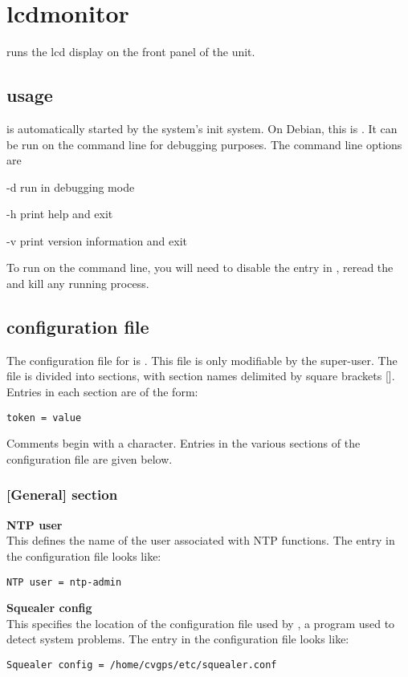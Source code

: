 \section{lcdmonitor}

 runs the lcd display on the front panel of the  unit.

\subsection{usage}
 is automatically started by the system's init system. On Debian, this is . It can be run on
the command line for debugging purposes. The command line options are
\begin{description*}
	\item[-d]	run in debugging mode
	\item[-h]	print help and exit
	\item[-v]	print version information and exit
\end{description*}
To run  on the command line, you will need to disable the entry in ,
reread the  and kill any running  process.

\subsection{configuration file \label{confformat}}

The configuration file for  is . This file is
only modifiable by the super-user. The file is divided into
sections, with section names delimited by square brackets [\space]. Entries in each section
are of the form:
\begin{lstlisting}
token = value
\end{lstlisting}
Comments begin with a \cc{\#} character. Entries in the various sections of the configuration file
are given below. 

\subsubsection{[General] section}

{\bfseries NTP user}\\
This  defines the name of the user associated with NTP functions.
The entry in the configuration file looks like:
\begin{lstlisting}
NTP user = ntp-admin
\end{lstlisting}
{\bfseries Squealer config}\\
This  specifies the location of the configuration file used by , a
program used to detect system problems.
The entry in the configuration file looks like:
\begin{lstlisting}
Squealer config = /home/cvgps/etc/squealer.conf
\end{lstlisting}

